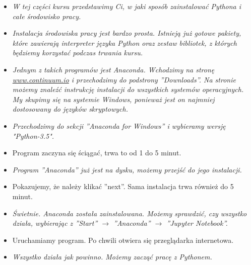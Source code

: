 \documentclass{mwart}
\begin{document}
\begin{itemize}
  \item \emph{W tej części kursu przedstawimy Ci, w jaki sposób zainstalować Pythona i
      całe środowisko pracy.}
  \item \emph{Instalacja środowiska pracy jest bardzo prosta. Istnieją już gotowe pakiety,
    które zawierają interpreter języka Python oraz zestaw bibliotek, z których będziemy
    korzystać podczas trwania kursu.}
\item \emph{Jednym z takich programów jest Anaconda. Wchodzimy na stronę
    \url{www.continuum.io} i przechodzimy do podstrony ''Downloads''. Na stronie możemy
    znaleźć instrukcję instalacji do wszystkich systemów operacyjnych. My skupimy się
    na systemie Windows, ponieważ jest on najmniej dostosowany do języków skryptowych.}
\item \emph{Przechodzimy do sekcji ''Anaconda for Windows'' i wybieramy wersję
    "Python-3.5".}
  \item Program zaczyna się ściągać, trwa to od 1 do 5 minut.
  \item \emph{Program ''Anaconda'' już jest na dysku, możemy przejść do jego instalacji.}
  \item Pokazujemy, że należy klikać ''next''. Sama instalacja trwa również do 5 minut.
  \item \emph{Świetnie. Anaconda została zainstalowana. Możemy sprawdzić, czy wszystko działa,
    wybierając z ''Start'' $\rightarrow$ ''Anaconda'' $\rightarrow$ ''Jupyter
    Notebook''.}
  \item Uruchamiamy program. Po chwili otwiera się przeglądarka internetowa.
  \item \emph{Wszystko działa jak powinno. Możemy zacząć pracę z Pythonem.}
\end{itemize}
\end{document}
